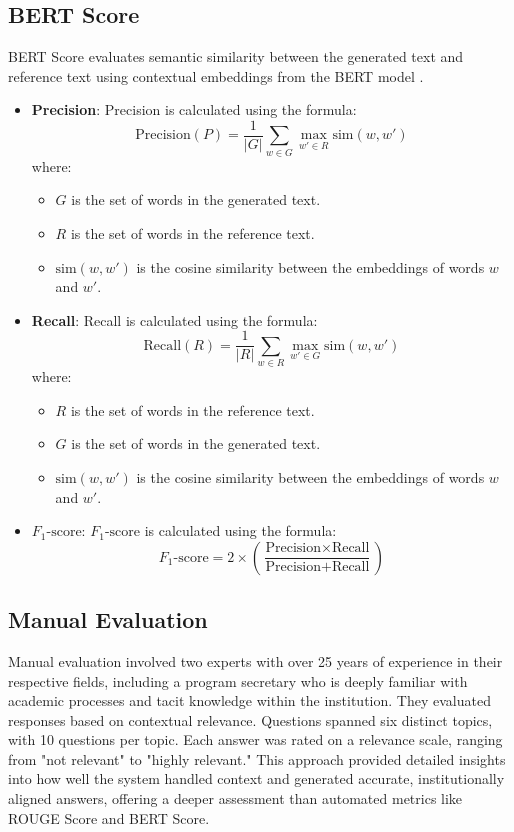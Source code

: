 \documentclass[runningheads]{llncs}
\begin{document}
\subsection{BERT Score}
BERT Score evaluates semantic similarity between the generated text and reference text using contextual embeddings from the BERT model \cite{Zhang2020}.
\begin{itemize}
    \item \textbf{Precision}: Precision is calculated using the formula:
    \[
    \text{Precision} (P) = \frac{1}{|G|} \sum_{w \in G} \max_{w' \in R} \text{sim}(w, w')
    \]
    where:
    \begin{itemize}
      \item \( G \) is the set of words in the generated text.
      \item \( R \) is the set of words in the reference text.
      \item \( \text{sim}(w, w') \) is the cosine similarity between the embeddings of words \( w \) and \( w' \).
    \end{itemize}

    \item \textbf{Recall}: Recall is calculated using the formula:
    \[
    \text{Recall} (R) = \frac{1}{|R|} \sum_{w \in R} \max_{w' \in G} \text{sim}(w, w')
    \]
    where:
    \begin{itemize}
      \item \( R \) is the set of words in the reference text.
      \item \( G \) is the set of words in the generated text.
      \item \( \text{sim}(w, w') \) is the cosine similarity between the embeddings of words \( w \) and \( w' \).
    \end{itemize}

    \item \textbf{\( F_{1}\text{-score} \)}: 
    \( F_{1}\text{-score} \) is calculated using the formula:
    \[
    F_{1}\text{-score} = 2 \times \left( \frac{\text{Precision} \times \text{Recall}}{\text{Precision} + \text{Recall}} \right)
    \]
\end{itemize}
    
\subsection{Manual Evaluation}
Manual evaluation involved two experts with over  25 years of experience in their respective fields, including a program secretary who is deeply familiar with academic processes and tacit knowledge within the institution. They evaluated responses based on contextual relevance. Questions spanned six distinct topics, with 10 questions per topic. Each answer was rated on a relevance scale, ranging from "not relevant" to "highly relevant." This approach provided detailed insights into how well the system handled context and generated accurate, institutionally aligned answers, offering a deeper assessment than automated metrics like ROUGE Score and BERT Score.
\end{document}
